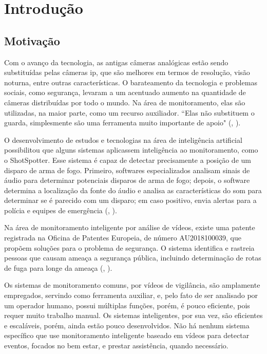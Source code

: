 \documentclass[]{politex}
\begin{document}
	
\chapter{Introdução}
\section{Motivação}
Com o avanço da tecnologia, as antigas câmeras analógicas estão sendo substituídas pelas câmeras \acrshort{ip}, que são melhores em termos de resolução, visão noturna, entre outras características. O barateamento da tecnologia e problemas sociais, como segurança, levaram a um acentuado aumento na quantidade de câmeras distribuídas por todo o mundo. Na área de monitoramento, elas são utilizadas, na maior parte, como um recurso auxiliador.  “Elas não substituem o guarda, simplesmente são uma ferramenta muito importante de apoio" (, \citeyear{bermudez}).

O desenvolvimento de estudos e tecnologias na área de inteligência artificial possibilitou que alguns sistemas aplicassem inteligência ao monitoramento, como o ShotSpotter. Esse sistema é capaz de detectar precisamente a posição de um disparo de arma de fogo. Primeiro, softwares especializados analisam sinais de áudio para determinar potenciais disparos de arma de fogo; depois, o software determina a localização da fonte do áudio e analisa as características do som para determinar se é parecido com um disparo; em caso positivo, envia alertas para a polícia e equipes de emergência (, \citeyear{shotspooter}).

Na área de monitoramento inteligente por análise de vídeos, existe uma patente registrada na Oficina de Patentes Europeia, de número AU2018100039, que propõem soluções para o problema de segurança. O sistema identifica e rastreia pessoas que causam ameaça a segurança pública, incluindo determinação de rotas de fuga para longe da ameaça (, \citeyear{patente}).

Os sistemas de monitoramento comuns, por vídeos de vigilância, são amplamente empregados, servindo como ferramenta auxiliar, e, pelo fato de ser analisado por um operador humano, possui múltiplas funções, porém, é pouco eficiente, pois requer muito trabalho manual. Os sistemas inteligentes, por sua vez, são eficientes e escaláveis, porém, ainda estão pouco desenvolvidos. Não há nenhum sistema específico que use monitoramento inteligente baseado em vídeos para detectar eventos, focados no bem estar, e prestar assistência, quando necessário.
\end{document}
